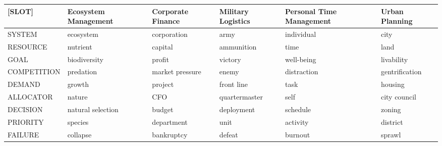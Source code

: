 {\def\LTcaptype{none} %
\begin{longtable}[]{@{}
  >{\raggedright\arraybackslash}p{}
  >{\raggedright\arraybackslash}p{}
  >{\raggedright\arraybackslash}p{}
  >{\raggedright\arraybackslash}p{}
  >{\raggedright\arraybackslash}p{}
  >{\raggedright\arraybackslash}p{}@{}}
\toprule\noalign{}
\begin{minipage}[b]{\linewidth}\raggedright
{[}SLOT{]}
\end{minipage} & \begin{minipage}[b]{\linewidth}\raggedright
Ecosystem Management
\end{minipage} & \begin{minipage}[b]{\linewidth}\raggedright
Corporate Finance
\end{minipage} & \begin{minipage}[b]{\linewidth}\raggedright
Military Logistics
\end{minipage} & \begin{minipage}[b]{\linewidth}\raggedright
Personal Time Management
\end{minipage} & \begin{minipage}[b]{\linewidth}\raggedright
Urban Planning
\end{minipage} \\
\midrule\noalign{}
\endhead
\bottomrule\noalign{}
\endlastfoot
SYSTEM & ecosystem & corporation & army & individual & city \\
RESOURCE & nutrient & capital & ammunition & time & land \\
GOAL & biodiversity & profit & victory & well-being & livability \\
COMPETITION & predation & market pressure & enemy & distraction & gentrification \\
DEMAND & growth & project & front line & task & housing \\
ALLOCATOR & nature & CFO & quartermaster & self & city council \\
DECISION & natural selection & budget & deployment & schedule & zoning \\
PRIORITY & species & department & unit & activity & district \\
FAILURE & collapse & bankruptcy & defeat & burnout & sprawl \\

\end{longtable}}
